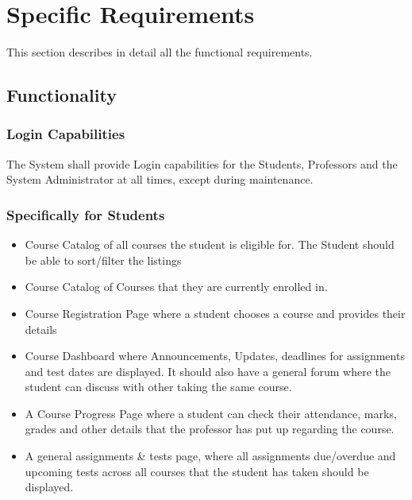 \documentclass[12pt, a4]{report}
\begin{document}
\chapter{Specific Requirements}
This section describes in detail all the functional requirements.


\section{Functionality}

\subsection{Login Capabilities}
The System shall provide Login capabilities for the Students, Professors and the System Administrator at all times, except during maintenance.

\subsection{Specifically for Students}
\begin{itemize}
    \item Course Catalog  of all courses the student is eligible for. The Student should be able to sort/filter the listings
    \item Course Catalog of Courses that they are currently enrolled in.
    \item Course Registration Page where a student chooses a course and provides their details
    \item Course Dashboard where Announcements, Updates, deadlines for assignments and test dates are displayed. It should also have a general forum where the student can discuss with other taking the same course.
    \item A Course Progress Page where a student can check their attendance, marks, grades and other details that the professor has put up regarding the course.
    \item A general assignments \& tests page, where all assignments due/overdue and upcoming tests across all courses that the student has taken should be displayed.
\end{itemize}
\end{document}
